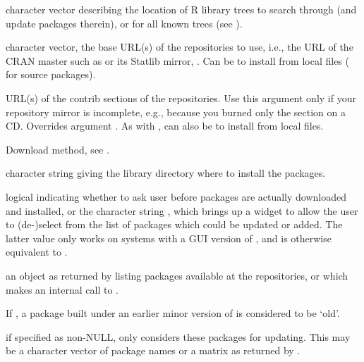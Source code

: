 \begin{Arguments}
\begin{ldescription}
\item[\code{lib.loc}] character vector describing the location of R
library trees to search through (and update packages therein), or
 for all known trees (see ).
\item[\code{repos}] character vector, the base URL(s) of the repositories
to use, i.e., the URL of the CRAN master such as
 or its Statlib mirror,
.
Can be  to install from local files
( for source packages).

\item[\code{contriburl}] URL(s) of the contrib sections of the
repositories.  Use this argument only if your repository mirror is
incomplete, e.g., because you burned only the  section on a
CD.  Overrides argument .  As with , can
also be  to install from local files.

\item[\code{method}] Download method, see .
\item[\code{instlib}] character string giving the library directory where to
install the packages.
\item[\code{ask}] logical indicating whether to ask user before packages are
actually downloaded and installed, or the character string
, which brings up a widget to allow the
user to (de-)select from the list of packages which could
be updated or added.  The latter value only works on
systems with a GUI version of ,
and is otherwise equivalent to .     

\item[\code{available}] 
an object as returned by 
listing packages available at the repositories, or  which
makes an internal call to .

\item[\code{checkBuilt}] If , a package built under an earlier
minor version of \R{} is considered to be `old'.
\item[\code{oldPkgs}] 
if specified as non-NULL,  only considers
these packages for updating. This may be a character vector
of package names or a matrix as returned by .


\end{ldescription}
\end{Arguments}
